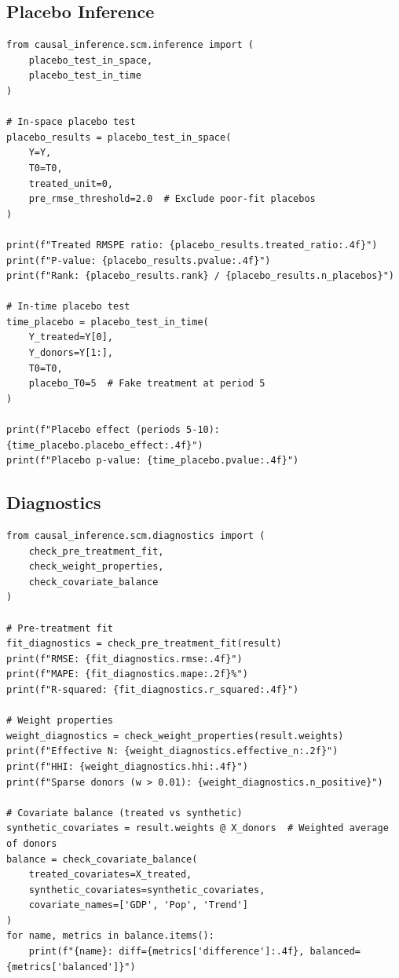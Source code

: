 \subsection{Placebo Inference}

\begin{verbatim}
from causal_inference.scm.inference import (
    placebo_test_in_space,
    placebo_test_in_time
)

# In-space placebo test
placebo_results = placebo_test_in_space(
    Y=Y,
    T0=T0,
    treated_unit=0,
    pre_rmse_threshold=2.0  # Exclude poor-fit placebos
)

print(f"Treated RMSPE ratio: {placebo_results.treated_ratio:.4f}")
print(f"P-value: {placebo_results.pvalue:.4f}")
print(f"Rank: {placebo_results.rank} / {placebo_results.n_placebos}")

# In-time placebo test
time_placebo = placebo_test_in_time(
    Y_treated=Y[0],
    Y_donors=Y[1:],
    T0=T0,
    placebo_T0=5  # Fake treatment at period 5
)

print(f"Placebo effect (periods 5-10): {time_placebo.placebo_effect:.4f}")
print(f"Placebo p-value: {time_placebo.pvalue:.4f}")
\end{verbatim}

\subsection{Diagnostics}

\begin{verbatim}
from causal_inference.scm.diagnostics import (
    check_pre_treatment_fit,
    check_weight_properties,
    check_covariate_balance
)

# Pre-treatment fit
fit_diagnostics = check_pre_treatment_fit(result)
print(f"RMSE: {fit_diagnostics.rmse:.4f}")
print(f"MAPE: {fit_diagnostics.mape:.2f}%")
print(f"R-squared: {fit_diagnostics.r_squared:.4f}")

# Weight properties
weight_diagnostics = check_weight_properties(result.weights)
print(f"Effective N: {weight_diagnostics.effective_n:.2f}")
print(f"HHI: {weight_diagnostics.hhi:.4f}")
print(f"Sparse donors (w > 0.01): {weight_diagnostics.n_positive}")

# Covariate balance (treated vs synthetic)
synthetic_covariates = result.weights @ X_donors  # Weighted average of donors
balance = check_covariate_balance(
    treated_covariates=X_treated,
    synthetic_covariates=synthetic_covariates,
    covariate_names=['GDP', 'Pop', 'Trend']
)
for name, metrics in balance.items():
    print(f"{name}: diff={metrics['difference']:.4f}, balanced={metrics['balanced']}")
\end{verbatim}

